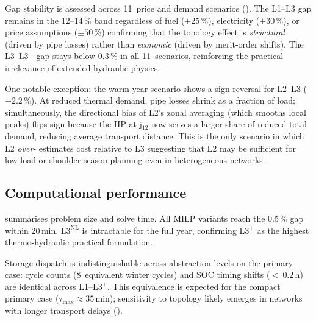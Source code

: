 \documentclass[a4paper,fleqn]{cas-dc}
\newcommand{\Lplus}{\mathrm{L3}^{+}}
\newcommand{\Lnl}{\mathrm{L3}^{\mathrm{NL}}}
\begin{document}
Gap stability is assessed across 11~price and demand scenarios
(). The L1--L3 gap remains in the
12--14\,\% band regardless of fuel (${\pm}25\,\%$), electricity
(${\pm}30\,\%$), or  price assumptions
(${\pm}50\,\%$) confirming that the topology effect is
\emph{structural} (driven by pipe losses) rather than
\emph{economic} (driven by merit-order shifts). The L3--$\Lplus$
gap stays below 0.3\,\% in all 11~scenarios, reinforcing the
practical irrelevance of extended hydraulic physics.

One notable exception: the warm-year scenario shows a sign
reversal for L2--L3 ($-2.2\,\%$). At reduced thermal demand,
pipe losses shrink as a fraction of load; simultaneously, the
directional bias of L2's zonal averaging (which smooths local
peaks) flips sign because the HP at j$_{12}$ now serves a larger
share of reduced total demand, reducing average transport
distance. This is the only scenario in which L2 \emph{over}-
estimates cost relative to L3 suggesting that L2 may be
sufficient for low-load or shoulder-season planning even in
heterogeneous networks. 

\subsection{Computational performance}
\label{sec:results_computation}

 summarises problem size and solve time. All
MILP variants reach the 0.5\,\% gap within 20\,min. $\Lnl$ is
intractable for the full year, confirming $\Lplus$ as the
highest thermo-hydraulic practical formulation.

Storage dispatch is indistinguishable across abstraction levels
on the primary case: cycle counts (8~equivalent winter cycles)
and SOC timing shifts (${<}\,0.2$\,h) are identical across
L1--$\Lplus$. This equivalence is expected for the compact
primary case ($\tau_{\max} \approx 35$\,min); sensitivity to
topology likely emerges in networks with longer transport delays
().
\end{document}
